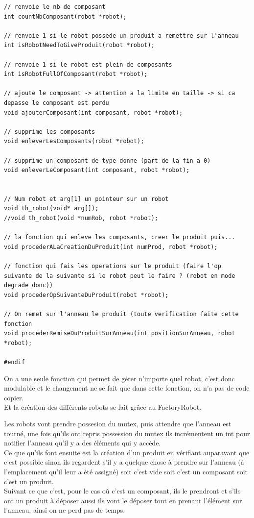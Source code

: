 \documentclass{report}
\begin{document}
\begin{lstlisting}[caption=Représentation des robots]
// renvoie le nb de composant
int countNbComposant(robot *robot);

// renvoie 1 si le robot possede un produit a remettre sur l'anneau
int isRobotNeedToGiveProduit(robot *robot);

// renvoie 1 si le robot est plein de composants
int isRobotFullOfComposant(robot *robot);

// ajoute le composant -> attention a la limite en taille -> si ca depasse le composant est perdu
void ajouterComposant(int composant, robot *robot);

// supprime les composants
void enleverLesComposants(robot *robot);

// supprime un composant de type donne (part de la fin a 0)
void enleverLeComposant(int composant, robot *robot);


// Num robot et arg[1] un pointeur sur un robot
void th_robot(void* arg[]);
//void th_robot(void *numRob, robot *robot);

// la fonction qui enleve les composants, creer le produit puis...
void procederALaCreationDuProduit(int numProd, robot *robot);

// fonction qui fais les operations sur le produit (faire l'op suivante de la suivante si le robot peut le faire ? (robot en mode degrade donc))
void procederOpSuivanteDuProduit(robot *robot);

// On remet sur l'anneau le produit (toute verification faite cette fonction
void procederRemiseDuProduitSurAnneau(int positionSurAnneau, robot *robot);

#endif
\end{lstlisting}


On a une seule fonction qui permet de gérer n'importe quel robot, c'est donc modulable et le changement ne se fait que dans cette fonction, on n'a pas de code copier.\\
Et la création des différents robots se fait grâce au FactoryRobot.


Les robots vont prendre possesion du mutex, puis attendre que l'anneau est tourné, une fois qu'ils ont repris possession du mutex ils incrémentent un int pour notifier l'anneau qu'il y a des éléments qui y accède.\\
Ce que qu'ils font ensuite est la création d'un produit en vérifiant auparavant que c'est possible sinon ils regardent s'il y a quelque chose à prendre sur l'anneau (à l'emplacement qu'il leur a été assigné) soit c'est vide soit c'est un composant soit c'est un produit.\\
Suivant ce que c'est, pour le cas où c'est un composant, ils le prendront et s'ils ont un produit à déposer aussi ils vont le déposer tout en prenant l'élément sur l'anneau, ainsi on ne perd pas de temps.
\end{document}
